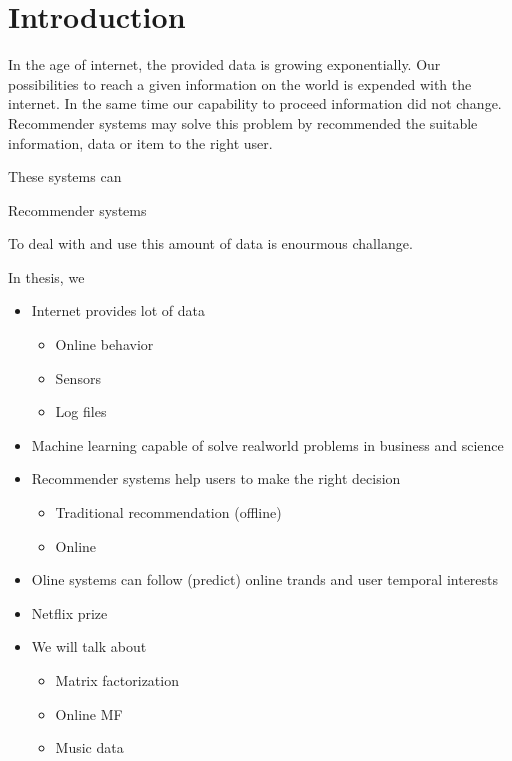 \chapter{Introduction}

In the age of internet, the provided data is growing exponentially. Our possibilities
to reach a given information on the world  is expended with the internet. In the same
time our capability to proceed information did not change. Recommender systems may solve
this problem by recommended the suitable information, data or item  to the right user.

These systems can 


Recommender systems 

To deal with and use
this amount of data is enourmous challange.

In thesis, we 


\begin{itemize}  
\item Internet provides lot of data 
  \begin{itemize}
  \item Online behavior
  \item Sensors
  \item Log files 
  \end{itemize}
\item Machine learning capable of solve realworld problems in business and
  science
\item Recommender systems help users to make the right decision
  \begin{itemize}
  \item Traditional recommendation (offline)
  \item Online 
  \end{itemize}
\item Oline systems can follow (predict) online trands and user temporal
  interests
\item Netflix prize
\item We will talk about
  \begin{itemize}
  \item Matrix factorization
  \item Online MF
  \item Music data 
  \end{itemize}
\end{itemize}
